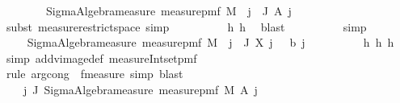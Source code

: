\begin{isabellebody}
\ \ \ \ \ \ \ \ Sigma{\isacharunderscore}{\kern0pt}Algebra{\isachardot}{\kern0pt}measure\ {\isacharparenleft}{\kern0pt}measure{\isacharunderscore}{\kern0pt}pmf\ M{\isacharparenright}{\kern0pt}\ {\isacharparenleft}{\kern0pt}{\isasymInter}\ j\ {\isasymin}\ J{\isachardot}{\kern0pt}\ A\ j{\isacharparenright}{\kern0pt}{\isachardoublequoteclose}\isanewline
\ \ \ \ \ \ \ \ \isamarkupfalse%
\ {\isacharparenleft}{\kern0pt}subst\ measure{\isacharunderscore}{\kern0pt}restrict{\isacharunderscore}{\kern0pt}space{\isacharcomma}{\kern0pt}\ simp{\isacharparenright}{\kern0pt}\isanewline
\ \ \ \ \ \ \ \ \isamarkupfalse%
\ h{}\ h{}\ \isamarkupfalse%
\ blast\isanewline
\ \ \ \ \ \ \ \ \isamarkupfalse%
\ simp\isanewline
\ \ \ \ \ \ \isamarkupfalse%
\ \isamarkupfalse%
\ {\isachardoublequoteopen}{\isachardot}{\kern0pt}{\isachardot}{\kern0pt}{\isachardot}{\kern0pt}\ {\isacharequal}{\kern0pt}\ Sigma{\isacharunderscore}{\kern0pt}Algebra{\isachardot}{\kern0pt}measure\ {\isacharparenleft}{\kern0pt}measure{\isacharunderscore}{\kern0pt}pmf\ M{\isacharparenright}{\kern0pt}\ {\isacharparenleft}{\kern0pt}{\isacharbraceleft}{\kern0pt}{\isasymomega}{\isachardot}{\kern0pt}\ {\isasymforall}j\ {\isasymin}\ J{\isachardot}{\kern0pt}\ X\ j\ {\isasymomega}\ {\isacharequal}{\kern0pt}\ b\ j{\isacharbraceright}{\kern0pt}{\isacharparenright}{\kern0pt}{\isachardoublequoteclose}\isanewline
\ \ \ \ \ \ \ \ \isamarkupfalse%
\ h{}\ h{}\ h{}\ \isamarkupfalse%
\ {\isacharparenleft}{\kern0pt}simp\ add{\isacharcolon}{\kern0pt}vimage{\isacharunderscore}{\kern0pt}def\ measure{\isacharunderscore}{\kern0pt}Int{\isacharunderscore}{\kern0pt}set{\isacharunderscore}{\kern0pt}pmf{\isacharparenright}{\kern0pt}\isanewline
\ \ \ \ \ \ \ \ \isamarkupfalse%
\ {\isacharparenleft}{\kern0pt}rule\ arg{\isacharunderscore}{\kern0pt}cong{}\ {\isacharbrackleft}{\kern0pt}\ f{\isacharequal}{\kern0pt}{\isachardoublequoteopen}measure{\isachardoublequoteclose}{\isacharbrackright}{\kern0pt}{\isacharcomma}{\kern0pt}\ simp{\isacharcomma}{\kern0pt}\ blast{\isacharparenright}{\kern0pt}\isanewline
\ \ \ \ \ \ \isamarkupfalse%
\ \isamarkupfalse%
\ {\isachardoublequoteopen}{\isachardot}{\kern0pt}{\isachardot}{\kern0pt}{\isachardot}{\kern0pt}\ {\isacharequal}{\kern0pt}\ {\isacharparenleft}{\kern0pt}{\isasymProd}\ j{\isasymin}\ J{\isachardot}{\kern0pt}\ Sigma{\isacharunderscore}{\kern0pt}Algebra{\isachardot}{\kern0pt}measure\ {\isacharparenleft}{\kern0pt}measure{\isacharunderscore}{\kern0pt}pmf\ M{\isacharparenright}{\kern0pt}\ {\isacharparenleft}{\kern0pt}A\ j{\isacharparenright}{\kern0pt}{\isacharparenright}{\kern0pt}{\isachardoublequoteclose}\isanewline

\end{isabellebody}
